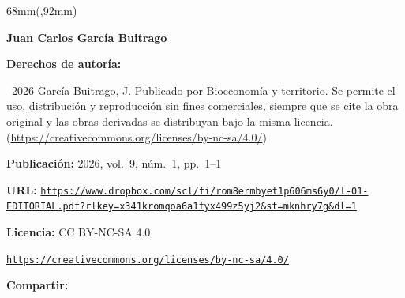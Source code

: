 \begin{textblock*}{68mm}(\gbbloquex,92mm)
{\setlength{\leftskip}{0pt}\setlength{\parindent}{0pt}%
\noindent\begin{minipage}[t]{68mm}
\sffamily\small\setlength{\parskip}{1pt}
{\bfseries\color{azulrevista}Juan Carlos García Buitrago}\par
\vspace{6pt}
{\bfseries\color{azulrevista!70}Derechos de autor\'ia:}\par
\textcopyright\ 2026 García Buitrago, J. Publicado por Bioeconomía y territorio. Se permite el uso, distribución y reproducción sin fines comerciales, siempre que se cite la obra original y las obras derivadas se distribuyan bajo la misma licencia. (\href{https://creativecommons.org/licenses/by-nc-sa/4.0/}{https://creativecommons.org/licenses/by-nc-sa/4.0/})\par\vspace{6pt}
{\bfseries\color{azulrevista!70}Publicación:} 2026, vol.~9, n\'um.~1, pp.~1--1\par\vspace{6pt}
{\bfseries\color{azulrevista!70}URL:} {\scriptsize\texttt{\href{https://www.dropbox.com/scl/fi/rom8ermbyet1p606ms6y0/l-01-EDITORIAL.pdf?rlkey=x341kromqoa6a1fyx499z5yj2&st=mknhry7g&dl=1}{https://www.dropbox.com/scl/fi/rom8ermbyet1p606ms6y0/l-01-EDITORIAL.pdf?rlkey=x341kromqoa6a1fyx499z5yj2&st=mknhry7g&dl=1}}}\par\vspace{6pt}
{\bfseries\color{azulrevista!70}Licencia:} CC BY-NC-SA 4.0\par
{\scriptsize\texttt{\href{https://creativecommons.org/licenses/by-nc-sa/4.0/}{https://creativecommons.org/licenses/by-nc-sa/4.0/}}}\par
\vspace{6pt}
\vspace{6pt}
{\bfseries\color{azulrevista!70}Compartir:}\par\vspace{3pt}
{\large
\href{https://bsky.app/intent/compose?text=https%3A%2F%2Fwww.dropbox.com%2Fscl%2Ffi%2From8ermbyet1p606ms6y0%2Fl-01-EDITORIAL.pdf%3Frlkey%3Dx341kromqoa6a1fyx499z5yj2%26st%3Dmknhry7g%26dl%3D1}{}~
\href{mailto:?subject=Editorial&body=https%3A%2F%2Fwww.dropbox.com%2Fscl%2Ffi%2From8ermbyet1p606ms6y0%2Fl-01-EDITORIAL.pdf%3Frlkey%3Dx341kromqoa6a1fyx499z5yj2%26st%3Dmknhry7g%26dl%3D1}{}~
}
\end{minipage}}
\end{textblock*}
